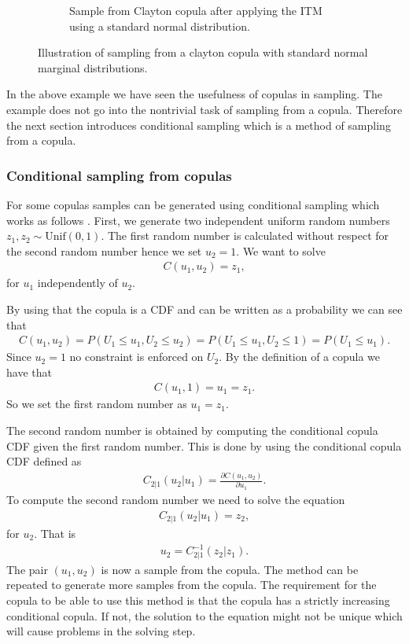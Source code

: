\begin{figure}[h]
\begin{subfigure}[t]{0.45\linewidth}
        \caption{Sample from Clayton copula after applying the \gls{ITM} using a standard normal distribution.}
        \label{fig:ReturnSpaceDataClayton}
    \end{subfigure}
    \caption{Illustration of sampling from a clayton copula with standard normal marginal distributions.}
    \label{fig:CopulaSampling}
\end{figure}


In the above example we have seen the usefulness of copulas in sampling. The example does not go into the nontrivial task of sampling from a copula. Therefore the next section introduces conditional sampling which is a method of sampling from a copula. 

\subsubsection{Conditional sampling from copulas}\label{sec:ConditionalSampling} 
For some copulas samples can be generated using conditional sampling which works as follows . First, we generate two independent uniform random numbers $z_1,z_2 \sim \mathrm{Unif}(0,1)$. 
The first random number is calculated without respect for the second random number hence we set $u_2 =1$. We want to solve
\begin{align*}
    C(u_1,u_2) =z_1,
\end{align*}
for $u_1$ independently of $u_2$. 

By using that the copula is a \gls{CDF} and can be written as a probability we can see that 
\begin{align*}
    C(u_1,u_2) = P(U_1\leq u_1, U_2\leq u_2) = P(U_1\leq u_1,U_2 \leq 1) = P(U_1\leq u_1).
\end{align*} 
Since $u_2 = 1$ no constraint is enforced on $U_2$. By the definition of a copula we have that 
\begin{align*}
    C(u_1,1) = u_1 = z_1.
\end{align*}
So we set the first random number as $u_1 = z_1$.

The second random number is obtained by computing the conditional copula \gls{CDF} given the first random number. This is done by using the conditional copula \gls{CDF} defined as
\begin{align*}
    C_{2|1}(u_2|u_1) = \frac{\partial C(u_1,u_2)}{\partial u_1}.
\end{align*}
To compute the second random number we need to solve the equation
\begin{align*}
    C_{2|1}(u_2|u_1) = z_2,
\end{align*}
for $u_2$. That is
\begin{align*}
    u_2 = C^{-1}_{2|1}(z_2|z_1).
\end{align*}
The pair $(u_1,u_2)$ is now a sample from the copula. The method can be repeated to generate more samples from the copula. The requirement for the copula to be able to use this method is that the copula has a strictly increasing conditional copula. If not, the solution to the equation might not be unique which will cause problems in the solving step. 

